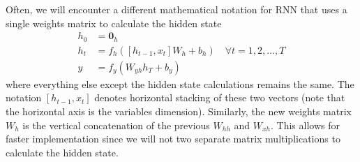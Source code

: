 \documentclass[../../deep_learning_notes.tex]{subfiles}
\begin{document}
Often, we will encounter a different mathematical notation for RNN that uses a single weights matrix to calculate the hidden state
\begin{align*}
    h_{0} &= \bm{0}_{h}\\
    h_{t} &= f_{h}([h_{t-1}, x_{t}]W_{h} + b_{h}) \quad \forall t = 1, 2, \ldots, T\\
    y &= f_{y}(W_{yh}h_{T} + b_{y})
\end{align*}
where everything else except the hidden state calculations remains the same. The notation $[h_{t-1}, x_{t}]$ denotes horizontal stacking of these two vectors (note that the horizontal axis is the variables dimension). Similarly, the new weights matrix $W_{h}$ is the vertical concatenation of the previous $W_{hh}$ and $W_{xh}$. This allows for faster implementation since we will not two separate matrix multiplications to calculate the hidden state.
\end{document}
